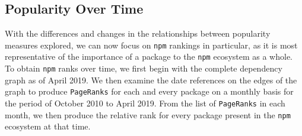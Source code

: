 \documentclass[10pt,conference]{IEEEtran}
\def\code#1{\texttt{#1}}
\begin{document}





\subsection{Popularity Over Time}

With the differences and changes in the relationships between
popularity measures explored, we can now focus on \code{npm}
rankings in particular, as it is most representative of the 
importance of a package to the \code{npm} ecosystem as a whole.
To obtain \code{npm} ranks over time, we first begin with the
complete dependency graph as of April 2019. We then examine
the date references on the edges of the graph to produce \code{PageRanks}
for each and every package on a monthly basis for the period of October 2010
to April 2019. From the list of \code{PageRanks} in each month, we then
produce the relative rank for every package present in the \code{npm}
ecosystem at that time. 
\end{document}
